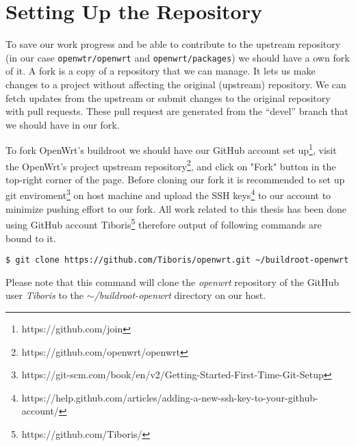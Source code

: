 \chapter{Setting Up the Repository}\label{set_repo}

To save our work progress and be able to contribute to the upstream repository (in our case {\tt openwtr/openwrt} and {\tt openwrt/packages}) we should have a own fork of it.
A fork is a copy of a repository that we can manage.
It lets us make changes to a project without affecting the original (upstream) repository.
We can fetch updates from the upstream or submit changes to the original repository with pull requests.
These pull request are generated from the “devel” branch that we should have in our fork.

To fork OpenWrt's buildroot we should have our GitHub account set up\footnote{https://github.com/join}, visit the OpenWrt's project upstream repository\footnote{https://github.com/openwrt/openwrt}, and click on "Fork" button in the top-right corner of the page.
Before cloning our fork it is recommended to set up git enviroment\footnote{https://git-scm.com/book/en/v2/Getting-Started-First-Time-Git-Setup} on host machine and upload the SSH keys\footnote{https://help.github.com/articles/adding-a-new-ssh-key-to-your-github-account/} to our account to minimize pushing effort to our fork.
All work related to this thesis has been done using GitHub account Tiboris\footnote{https://github.com/Tiboris/} therefore output of following commands are bound to it.
\begin{lstlisting}[columns=fixed,basicstyle=\ttfamily\footnotesize,basicstyle=\ttfamily\footnotesize,tabsize=4,backgroundcolor=\color{yellow!10}]
$ git clone https://github.com/Tiboris/openwrt.git ~/buildroot-openwrt
\end{lstlisting}
Please note that this command will clone the {\it openwrt} repository of the GitHub user {\it Tiboris} to the {\it $\sim$/buildroot-openwrt} directory on our host.

